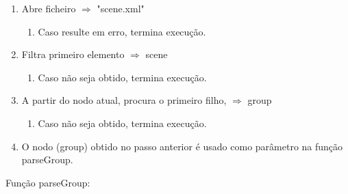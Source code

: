 \documentclass[a4paper]{article}
\begin{document}
\ttfamily
\begin{enumerate}
 \item Abre ficheiro $\Rightarrow$ "scene.xml"
    \begin{enumerate}
      \item Caso resulte em erro, termina execução.
    \end{enumerate}
 \item Filtra primeiro elemento $\Rightarrow$ scene
    \begin{enumerate}
      \item Caso não seja obtido, termina execução.
    \end{enumerate}
 \item A partir do nodo atual, procura o primeiro filho, $\Rightarrow$ group
    \begin{enumerate}
      \item Caso não seja obtido, termina execução.
    \end{enumerate}
 \item O nodo (group) obtido no passo anterior é usado como parâmetro na função parseGroup.
\end{enumerate}

  \vspace{0.3cm}

 Função parseGroup:

  \vspace{0.3cm}
\end{document}
